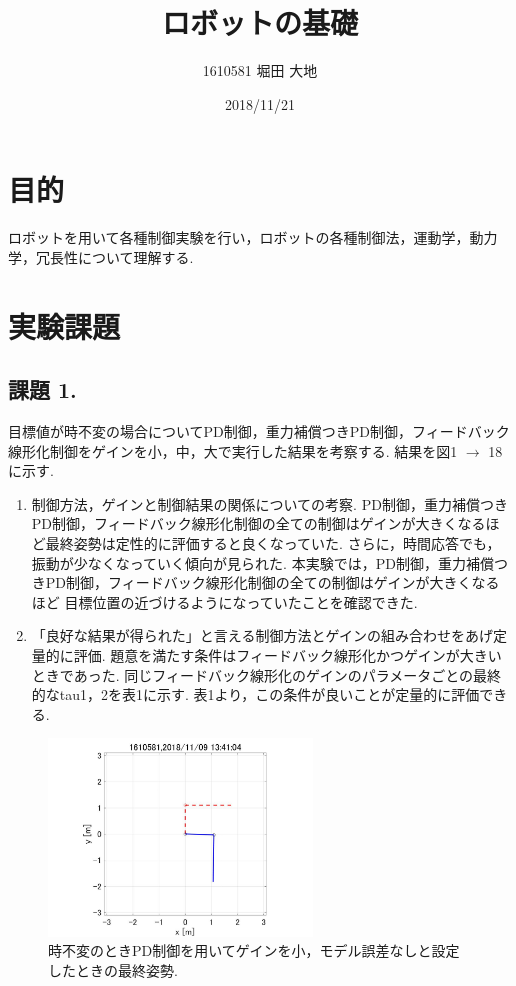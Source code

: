 \documentclass[twocolumn, 10pt,a4j]{jsarticle}
\title{\vspace{-2.5cm}ロボットの基礎}
\author{1610581 堀田 大地}
\date{2018/11/21}
\begin{document}
\maketitle{}
\section{目的}
  ロボットを用いて各種制御実験を行い，ロボットの各種制御法，運動学，動力学，冗長性について理解する.

\section{実験課題}
  \subsection{課題 1.}
    目標値が時不変の場合についてPD制御，重力補償つきPD制御，フィードバック線形化制御をゲインを小，中，大で実行した結果を考察する. 結果を図1 $\to$ 18に示す.
    \begin{enumerate}
      \item 制御方法，ゲインと制御結果の関係についての考察.
        PD制御，重力補償つきPD制御，フィードバック線形化制御の全ての制御はゲインが大きくなるほど最終姿勢は定性的に評価すると良くなっていた.
        さらに，時間応答でも，振動が少なくなっていく傾向が見られた. 本実験では，PD制御，重力補償つきPD制御，フィードバック線形化制御の全ての制御はゲインが大きくなるほど
        目標位置の近づけるようになっていたことを確認できた.

      \item 「良好な結果が得られた」と言える制御方法とゲインの組み合わせをあげ定量的に評価.
        題意を満たす条件はフィードバック線形化かつゲインが大きいときであった. 同じフィードバック線形化のゲインのパラメータごとの最終的なtau1，2を表1に示す. 表1より，この条件が良いことが定量的に評価できる.
    \end{enumerate}


    \begin{figure}[H]
      \begin{center}
        \includegraphics[width=7cm]{../img/img/kansetu_PD_zifuhen_small_no_model_gosa_saisyu_sisei.jpg}
        \caption{時不変のときPD制御を用いてゲインを小，モデル誤差なしと設定したときの最終姿勢.}
      \end{center}
    \end{figure}
\end{document}
